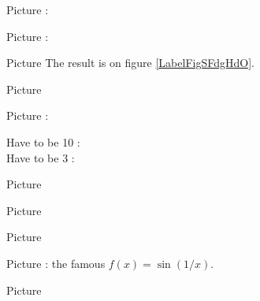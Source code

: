 Picture : 
\begin{center}
   
\end{center}

Picture : 
\begin{center}
   
\end{center}


Picture 
The result is on figure \ref{LabelFigSFdgHdO}. %
\newcommand{\CaptionFigSFdgHdO}{<+Type your caption here+>}


\clearpage

       Picture 
   \begin{center}

   \end{center}



\setcounter{page}{10}
\setcounter{section}{3}
Picture : 
\begin{center}
    Have to be 10 : \thepage\\
    Have to be 3 : \thesection\\
   
\end{center}




       Picture 
   \begin{center}

   \end{center}





Picture 
\newcommand{\CaptionFigOMPAooMbyOIqeA}{Marks are correct.}


\clearpage


Picture 
\begin{center}
   
\end{center}
   

\clearpage


Picture  : the famous \( f(x)=\sin(1/x)\).
\begin{center}
   
\end{center}
   

Picture 
\begin{center}
   
\end{center}
   


